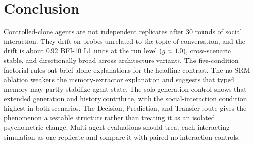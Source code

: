 \section{Conclusion}\label{sec:conclusion}
Controlled-clone agents are not independent replicates after 30 rounds of social interaction. They drift on probes unrelated to the topic of conversation, and the drift is about 0.92 BFI-10 L1 units at the run level ($g{\approx}1.0$), cross-scenario stable, and directionally broad across architecture variants. The five-condition factorial rules out brief-alone explanations for the headline contrast. The no-SRM ablation weakens the memory-extractor explanation and suggests that typed memory may partly stabilize agent state. The solo-generation control shows that extended generation and history contribute, with the social-interaction condition highest in both scenarios. The Decision, Prediction, and Transfer route gives the phenomenon a testable structure rather than treating it as an isolated psychometric change. Multi-agent evaluations should treat each interacting simulation as one replicate and compare it with paired no-interaction controls.
